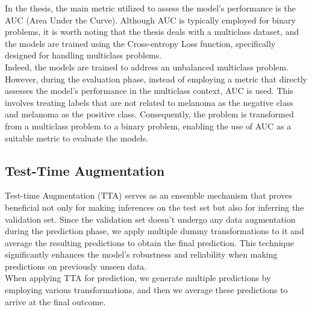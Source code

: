 In the thesis, the main metric utilized to assess the model's performance is
the AUC (Area Under the Curve). Although AUC is typically employed for binary
problems, it is worth noting that the thesis deals with a multiclass dataset,
and the models are trained using the Cross-entropy Loss function, specifically
designed for handling multiclass problems. \\

Indeed, the models are trained to address an unbalanced multiclass problem.
However, during the evaluation phase, instead of employing a metric that
directly assesses the model's performance in the multiclass context, AUC is
used. This involves treating labels that are not related to melanoma as the
negative class and melanoma as the positive class. Consequently, the problem is
transformed from a multiclass problem to a binary problem, enabling the use of
AUC as a suitable metric to evaluate the models.

\subsection{Test-Time Augmentation}

Test-time Augmentation (TTA) serves as an ensemble mechanism that proves
beneficial not only for making inferences on the test set but also for
inferring the validation set. Since the validation set doesn't undergo any data
augmentation during the prediction phase, we apply multiple dummy
transformations to it and average the resulting predictions to obtain the final
prediction. This technique significantly enhances the model's robustness and
reliability when making predictions on previously unseen data. \\

When applying TTA for prediction, we generate multiple predictions
by employing various transformations, and then we average these predictions to
arrive at the final outcome.

